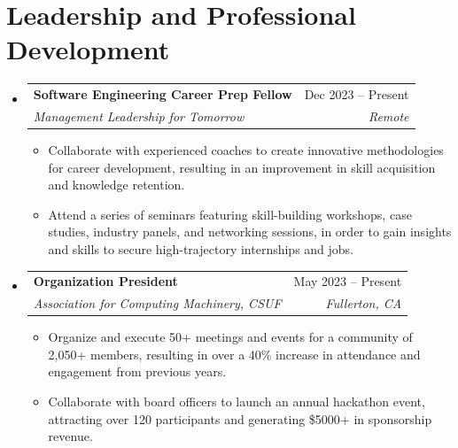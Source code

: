 \documentclass[letterpaper,11pt]{article}
\makeatletter
\newcommand{\resumeItem}[1]{
  \item\small{
    {#1 \vspace{-2pt}}
  }
}
\newcommand{\resumeSubheading}[4]{
  \vspace{-2pt}\item
    \begin{tabular*}{0.97\textwidth}[t]{l@{\extracolsep{\fill}}r}
      \textbf{#1} & #2 \\
      \textit{\small#3} & \textit{\small #4} \\
    \end{tabular*}\vspace{-7pt}
}
\newcommand{\resumeSubHeadingListStart}{\begin{itemize}[leftmargin=0.15in, label={}]}
\newcommand{\resumeSubHeadingListEnd}{\end{itemize}}
\newcommand{\resumeItemListStart}{\begin{itemize}}
\newcommand{\resumeItemListEnd}{\end{itemize}\vspace{-5pt}}
\makeatother
\begin{document}
  \section{Leadership and Professional Development}
  \resumeSubHeadingListStart
  \resumeSubheading
  {Software Engineering Career Prep Fellow}{Dec 2023 -- Present}
  {Management Leadership for Tomorrow}{Remote}
  \resumeItemListStart
  \resumeItem{Collaborate with experienced coaches to create innovative methodologies for career development, resulting in an improvement in skill acquisition and knowledge retention.}
  \resumeItem{Attend a series of seminars featuring skill-building workshops, case studies, industry panels, and networking sessions, in order to gain insights and skills to secure high-trajectory internships and jobs.}
  \resumeItemListEnd
  
  \resumeSubheading
  {Organization President}{May 2023 -- Present}
  {Association for Computing Machinery, CSUF}{Fullerton, CA}
  \resumeItemListStart
  \resumeItem{Organize and execute 50+ meetings and events for a community of 2,050+ members, resulting in over a 40\% increase in attendance and engagement from previous years.}
  \resumeItem{Collaborate with board officers to launch an annual hackathon event, attracting over 120 participants and generating \$5000+ in sponsorship revenue.}
  \resumeItemListEnd
  
  \resumeSubHeadingListEnd
  
  
\end{document}
